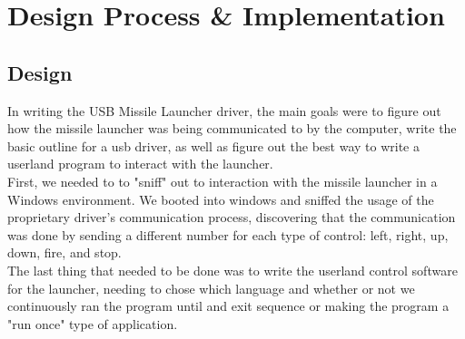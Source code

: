 \documentclass[letterpaper,10pt,titlepage]{article}
\begin{document}
%
%

\section{Design Process \& Implementation}
\subsection*{Design}

In writing the USB Missile Launcher driver, the main goals were to figure out how the missile launcher was being communicated to by the computer, write the basic outline for a usb driver, as well as figure out the best way to write a userland program to interact with the launcher.\\

First, we needed to to "sniff" out to interaction with the missile launcher in a Windows environment. We booted into windows and sniffed the usage of the proprietary driver's communication process, discovering that the communication was done by sending a different number for each type of control: left, right, up, down, fire, and stop.\\

The last thing that needed to be done was to write the userland control software for the launcher, needing to chose which language and whether or not we continuously ran the program until and exit sequence or making the program a "run once" type of application.\\



\end{document}
